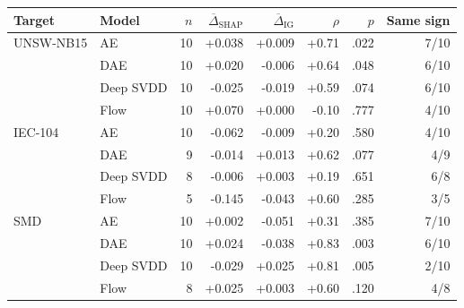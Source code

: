 \begin{tabular}{llrrrrrr}\toprule
Target & Model & $n$ & $\overline{\Delta}_{\text{SHAP}}$ & $\overline{\Delta}_{\text{IG}}$ & $\rho$ & $p$ & Same sign\\\midrule
UNSW-NB15 & AE & 10 & +0.038 & +0.009 & +0.71 & .022 & 7/10\\
 & DAE & 10 & +0.020 & -0.006 & +0.64 & .048 & 6/10\\
 & Deep SVDD & 10 & -0.025 & -0.019 & +0.59 & .074 & 6/10\\
 & Flow & 10 & +0.070 & +0.000 & -0.10 & .777 & 4/10\\
\midrule
IEC-104 & AE & 10 & -0.062 & -0.009 & +0.20 & .580 & 4/10\\
 & DAE & 9 & -0.014 & +0.013 & +0.62 & .077 & 4/9\\
 & Deep SVDD & 8 & -0.006 & +0.003 & +0.19 & .651 & 6/8\\
 & Flow & 5 & -0.145 & -0.043 & +0.60 & .285 & 3/5\\
\midrule
SMD & AE & 10 & +0.002 & -0.051 & +0.31 & .385 & 7/10\\
 & DAE & 10 & +0.024 & -0.038 & +0.83 & .003 & 6/10\\
 & Deep SVDD & 10 & -0.029 & +0.025 & +0.81 & .005 & 2/10\\
 & Flow & 8 & +0.025 & +0.003 & +0.60 & .120 & 4/8\\
\bottomrule\end{tabular}